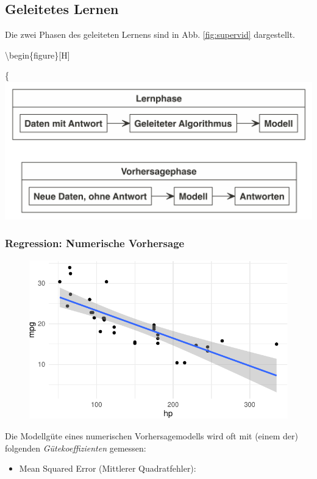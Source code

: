 \documentclass[
]{book}
\providecommand{\tightlist}{%
  \setlength{\itemsep}{0pt}\setlength{\parskip}{0pt}}
\begin{document}
\hypertarget{geleitetes-lernen}{%
\subsection{Geleitetes Lernen}\label{geleitetes-lernen}}

Die zwei Phasen des geleiteten Lernens sind in Abb. \ref{fig:supervid} dargestellt.

\textbackslash begin\{figure\}{[}H{]}

\{\centering \includegraphics[width=0.7\linewidth]{chunk-img/supervid-1}

\hypertarget{regression-numerische-vorhersage}{%
\subsubsection{Regression: Numerische Vorhersage}\label{regression-numerische-vorhersage}}

\begin{figure}[H]

{\centering \includegraphics[width=0.7\linewidth]{chunk-img/unnamed-chunk-8-1} 

}

\end{figure}

Die Modellgüte eines numerischen Vorhersagemodells wird oft mit (einem der) folgenden \emph{Gütekoeffizienten} gemessen:

\begin{itemize}
\tightlist
\item
  Mean Squared Error (Mittlerer Quadratfehler):
\end{itemize}
\end{document}
